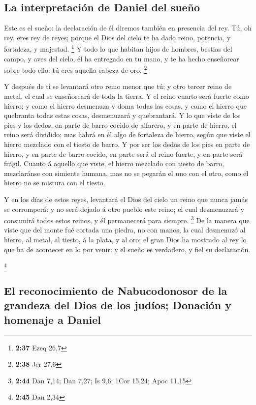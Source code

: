 \hypertarget{la-interpretaciuxf3n-de-daniel-del-sueuxf1o}{%
\subsection{La interpretación de Daniel del
sueño}\label{la-interpretaciuxf3n-de-daniel-del-sueuxf1o}}

 Este es el sueño: la declaración de él diremos también
en presencia del rey.  Tú, oh rey, eres rey de reyes;
porque el Dios del cielo te ha dado reino, potencia, y fortaleza, y
majestad. \footnote{\textbf{2:37} Ezeq 26,7}  Y todo lo
que habitan hijos de hombres, bestias del campo, y aves del cielo, él ha
entregado en tu mano, y te ha hecho enseñorear sobre todo ello: tú eres
aquella cabeza de oro. \footnote{\textbf{2:38} Jer 27,6}

 Y después de ti se levantará otro reino menor que tú; y
otro tercer reino de metal, el cual se enseñoreará de toda la tierra.
 Y el reino cuarto será fuerte como hierro; y como el
hierro desmenuza y doma todas las cosas, y como el hierro que quebranta
todas estas cosas, desmenuzará y quebrantará.  Y lo que
viste de los pies y los dedos, en parte de barro cocido de alfarero, y
en parte de hierro, el reino será dividido; mas habrá en él algo de
fortaleza de hierro, según que viste el hierro mezclado con el tiesto de
barro.  Y por ser los dedos de los pies en parte de
hierro, y en parte de barro cocido, en parte será el reino fuerte, y en
parte será frágil.  Cuanto á aquello que viste, el hierro
mezclado con tiesto de barro, mezclaránse con simiente humana, mas no se
pegarán el uno con el otro, como el hierro no se mistura con el tiesto.

 Y en los días de estos reyes, levantará el Dios del
cielo un reino que nunca jamás se corromperá: y no será dejado á otro
pueblo este reino; el cual desmenuzará y consumirá todos estos reinos, y
él permanecerá para siempre. \footnote{\textbf{2:44} Dan 7,14; Dan 7,27;
  Is 9,6; 1Cor 15,24; Apoc 11,15}  De la manera que viste
que del monte fué cortada una piedra, no con manos, la cual desmenuzó al
hierro, al metal, al tiesto, á la plata, y al oro; el gran Dios ha
mostrado al rey lo que ha de acontecer en lo por venir: y el sueño es
verdadero, y fiel su declaración.

\footnote{\textbf{2:45} Dan 2,34}

\hypertarget{el-reconocimiento-de-nabucodonosor-de-la-grandeza-del-dios-de-los-juduxedos-donaciuxf3n-y-homenaje-a-daniel}{%
\subsection{El reconocimiento de Nabucodonosor de la grandeza del Dios
de los judíos; Donación y homenaje a
Daniel}\label{el-reconocimiento-de-nabucodonosor-de-la-grandeza-del-dios-de-los-juduxedos-donaciuxf3n-y-homenaje-a-daniel}}

